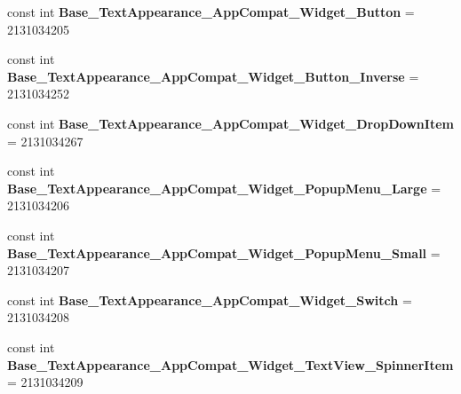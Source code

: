 \begin{DoxyCompactItemize}
\item 
\hypertarget{classClient_1_1Droid_1_1Resource_1_1Style_a3f5d1396fc6cf43dab8f85b97f470964}{}const int {\bfseries Base\+\_\+\+Text\+Appearance\+\_\+\+App\+Compat\+\_\+\+Widget\+\_\+\+Button} = 2131034205\label{classClient_1_1Droid_1_1Resource_1_1Style_a3f5d1396fc6cf43dab8f85b97f470964}

\item 
\hypertarget{classClient_1_1Droid_1_1Resource_1_1Style_a2fe3208fc2a804056f239f5fdbb58a3e}{}const int {\bfseries Base\+\_\+\+Text\+Appearance\+\_\+\+App\+Compat\+\_\+\+Widget\+\_\+\+Button\+\_\+\+Inverse} = 2131034252\label{classClient_1_1Droid_1_1Resource_1_1Style_a2fe3208fc2a804056f239f5fdbb58a3e}

\item 
\hypertarget{classClient_1_1Droid_1_1Resource_1_1Style_afac666e563b579f3960404cb718561e0}{}const int {\bfseries Base\+\_\+\+Text\+Appearance\+\_\+\+App\+Compat\+\_\+\+Widget\+\_\+\+Drop\+Down\+Item} = 2131034267\label{classClient_1_1Droid_1_1Resource_1_1Style_afac666e563b579f3960404cb718561e0}

\item 
\hypertarget{classClient_1_1Droid_1_1Resource_1_1Style_a3b5e440bbd8c16bf3975f3fed97ab62a}{}const int {\bfseries Base\+\_\+\+Text\+Appearance\+\_\+\+App\+Compat\+\_\+\+Widget\+\_\+\+Popup\+Menu\+\_\+\+Large} = 2131034206\label{classClient_1_1Droid_1_1Resource_1_1Style_a3b5e440bbd8c16bf3975f3fed97ab62a}

\item 
\hypertarget{classClient_1_1Droid_1_1Resource_1_1Style_a2fe791ffb3588b378d2cfa44015a6021}{}const int {\bfseries Base\+\_\+\+Text\+Appearance\+\_\+\+App\+Compat\+\_\+\+Widget\+\_\+\+Popup\+Menu\+\_\+\+Small} = 2131034207\label{classClient_1_1Droid_1_1Resource_1_1Style_a2fe791ffb3588b378d2cfa44015a6021}

\item 
\hypertarget{classClient_1_1Droid_1_1Resource_1_1Style_a834e9fc5fb35c0501ac7a0ecccf9634b}{}const int {\bfseries Base\+\_\+\+Text\+Appearance\+\_\+\+App\+Compat\+\_\+\+Widget\+\_\+\+Switch} = 2131034208\label{classClient_1_1Droid_1_1Resource_1_1Style_a834e9fc5fb35c0501ac7a0ecccf9634b}

\item 
\hypertarget{classClient_1_1Droid_1_1Resource_1_1Style_af29f77fd962b44a1747e9f5dfee8d430}{}const int {\bfseries Base\+\_\+\+Text\+Appearance\+\_\+\+App\+Compat\+\_\+\+Widget\+\_\+\+Text\+View\+\_\+\+Spinner\+Item} = 2131034209\label{classClient_1_1Droid_1_1Resource_1_1Style_af29f77fd962b44a1747e9f5dfee8d430}


\end{DoxyCompactItemize}
